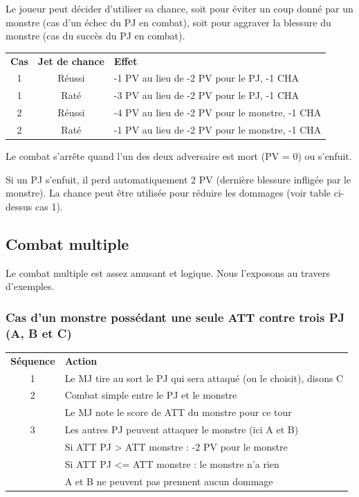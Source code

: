 \documentclass[a4paper, 11pt, twoside]{article}
\begin{document}
Le joueur peut décider d'utiliser sa chance, soit pour éviter un coup donné par un monstre (cas d'un échec du PJ en combat), soit pour aggraver la blessure du monstre (cas du succès du PJ en combat).

\begin{longtable}{ccl}
\textbf{Cas} & \textbf{Jet de chance} & \textbf{Effet}\\
1 & Réussi & -1 PV au lieu de -2 PV pour le PJ, -1 CHA\\
1 & Raté & -3 PV au lieu de -2 PV pour le PJ, -1 CHA\\
2 & Réussi & -4 PV au lieu de -2 PV pour le monstre, -1 CHA\\
2 & Raté & -1 PV au lieu de -2 PV pour le monstre, -1 CHA\\
\end{longtable}

Le combat s'arrête quand l'un des deux adversaire est mort (PV = 0) ou s'enfuit.

Si un PJ s'enfuit, il perd automatiquement 2 PV (dernière blessure infligée par le monstre). La chance peut être utilisée pour réduire les dommages (voir table ci-dessus cas 1).

\subsection{Combat multiple}
\label{sec:org6eea728}

Le combat multiple est assez amusant et logique. Nous l'exposons au travers d'exemples.

\subsubsection{Cas d'un monstre possédant une seule ATT contre trois PJ (A, B et C)}
\label{sec:org8ac368a}

\begin{longtable}{cl}
\textbf{Séquence} & \textbf{Action}\\
1 & Le MJ tire au sort le PJ qui sera attaqué (ou le choisit), disons C\\
2 & Combat simple entre le PJ et le monstre\\
 & Le MJ note le score de ATT du monstre pour ce tour\\
3 & Les autres PJ peuvent attaquer le monstre (ici A et B)\\
 & Si ATT PJ > ATT monstre : -2 PV pour le monstre\\
 & Si ATT PJ <= ATT monstre : le monstre n'a rien\\
 & A et B ne peuvent pas prennent aucun dommage\\
\end{longtable}
\end{document}
